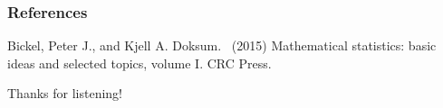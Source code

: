 \documentclass[serif,mathserif,professionalfont]{beamer}
\begin{document}
\begin{frame}
	
	\frametitle{References}
	
	\footnotesize{
		\begin{thebibliography}{99} %
			Bickel, Peter J., and Kjell A. Doksum. \ (2015) Mathematical statistics: basic ideas and selected topics, volume I. CRC Press.
		\end{thebibliography}
		
%		
%			
%		
%		
%		
%		
		
	}
\end{frame}






\begin{frame}
	\Huge{\centerline{Thanks for listening!}}
\end{frame}


\end{document}
